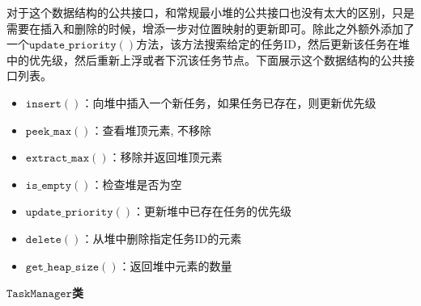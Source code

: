 \documentclass[cn,hazy,blue,10pt,normal]{elegantnote}
\begin{document}
对于这个数据结构的公共接口，和常规最小堆的公共接口也没有太大的区别，只是需要在插入和删除的时候，增添一步对位置映射的更新即可。除此之外额外添加了一个$\mathtt{update\_priority()}$方法，该方法搜索给定的任务ID，然后更新该任务在堆中的优先级，然后重新上浮或者下沉该任务节点。下面展示这个数据结构的公共接口列表。
\begin{itemize}
    \item $\mathtt{insert()}$：向堆中插入一个新任务，如果任务已存在，则更新优先级
    \item $\mathtt{peek\_max()}$：查看堆顶元素, 不移除
    \item $\mathtt{extract\_max()}$：移除并返回堆顶元素
    \item $\mathtt{is\_empty()}$：检查堆是否为空
    \item $\mathtt{update\_priority()}$：更新堆中已存在任务的优先级
    \item $\mathtt{delete()}$：从堆中删除指定任务ID的元素
    \item $\mathtt{get\_heap\_size()}$：返回堆中元素的数量
\end{itemize}


\textbf{$\mathtt{TaskManager}$类}
\end{document}
